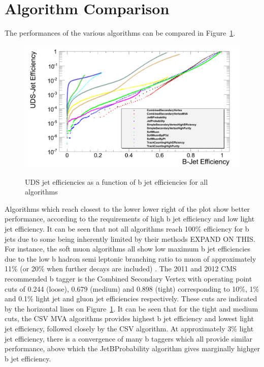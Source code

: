 \section{Algorithm Comparison}
\label{algorithm_comparison}

The performances of the various algorithms can be compared in Figure~\ref{fig:uds_eff_v_b_eff}.

\begin{figure}[hbtp]
   \centering
     \includegraphics[width=\textwidth]{Chapters/04_Analysis/04a_BTags/Images/UDS-JetEfficiency_v_B-JetEfficiency_withLegend}\\
     \caption{UDS jet efficiencies as a function of b jet efficiencies for all algorithms}
     \label{fig:uds_eff_v_b_eff}
\end{figure}

Algorithms which reach closest to the lower lower right of the plot show better performance, according to the
requirements of high b jet efficiency and low light jet efficiency. It can be seen that not all algorithms
reach 100\% efficiency for b jets due to some being inherently limited by their methods EXPAND ON THIS. For
instance, the soft muon algorithms all show low maximum b jet efficiencies due to the low b hadron semi
leptonic branching ratio to muon of approximately 11\% (or 20\% when further decays are included)
\cite{btagging_in_CMS}. The 2011 and 2012 CMS recommended b tagger is the Combined Secondary Vertex with
operating point cuts of 0.244 (loose), 0.679 (medium) and 0.898 (tight) corresponding to 10\%, 1\% and 0.1\%
light jet and gluon jet efficiencies respectively. These cuts are indicated by the horizontal lines on
Figure~\ref{fig:uds_eff_v_b_eff}. It can be seen that for the tight and medium cuts, the CSV MVA algorithms
provides highest b jet efficiency and lowest light jet efficiency, followed closely by the CSV algorithm. At
approximately 3\% light jet efficiency, there is a convergence of many b taggers which all provide similar
performance, above which the JetBProbability algorithm gives marginally highger b jet efficiency.

